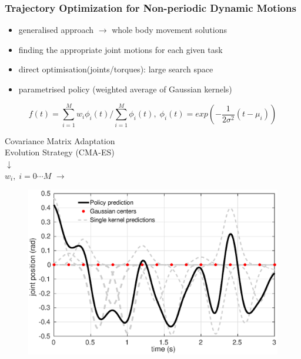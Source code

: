 \documentclass[11pt]{beamer}
\begin{document}
\begin{frame}\frametitle{\color{black} Trajectory Optimization for Non-periodic Dynamic Motions}
 \begin{itemize} \addtolength{\itemsep}{0.5ex}
  \item generalised approach $\rightarrow$ whole body movement solutions
 \end{itemize}
 \pause
 
   \begin{itemize}\small
   \item finding the appropriate joint motions for each given task
   \item direct optimisation(joints/torques): large search space
   \item parametrised policy (weighted average of Gaussian kernels)
  \end{itemize}

 \begin{equation}\nonumber
  f(t)  = \sum_{i=1}^{M} w_i \phi_i(t)/ \sum_{i=1}^{M} \phi_i(t), \; \phi_i(t) = 
exp(- \frac{1}{2 \sigma^2} (t-\mu_i))
  \end{equation} 
 \pause
  \begin{minipage}[t]{0.48\linewidth}
  \vspace*{15mm}
  \begin{center}
     Covariance Matrix Adaptation \\ Evolution Strategy (CMA-ES)  \\
      $\downarrow$ \\
      $ w_i, \; i = 0 \cdots M$ $\rightarrow$
        \end{center}
  \end{minipage}\hfill
  \begin{minipage}[t]{0.48\linewidth}
    \begin{figure}[h!]
  \includegraphics[scale=.3]{example_gr2.eps} 
  \end{figure}\end{minipage}
    
\end{frame}
\end{document}
